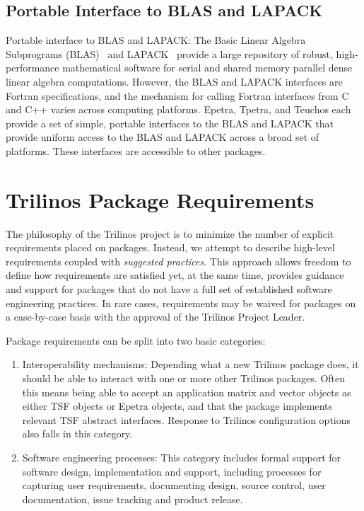 \documentclass[12pt,relax]{TrilinosDevGuide}
\begin{document}
\subsection{Portable Interface to BLAS and LAPACK}

Portable interface to BLAS and LAPACK: The Basic Linear Algebra
Subprograms (BLAS)~\cite{BLAS1,BLAS2,BLAS3} and LAPACK~\cite{lapack}
provide a large repository of robust, high-performance mathematical
software for serial and shared memory parallel dense linear algebra
computations.  However, the BLAS and LAPACK interfaces are Fortran
specifications, and the mechanism for calling Fortran interfaces from
C and C++ varies across computing platforms.  Epetra, Tpetra, and 
Teuchos each provide a set of simple, portable interfaces to the BLAS 
and LAPACK that provide uniform access to the BLAS and LAPACK across 
a broad set of platforms.  These interfaces are accessible to
other packages.

\section{Trilinos Package Requirements}
\label{Section:PackageRequirements}
The philosophy of the Trilinos project is to minimize the number of
explicit requirements placed on packages.  Instead, we attempt to
describe high-level requirements coupled with {\it suggested
practices}.  This approach allows freedom to define how
requirements are satisfied yet, at the same time, provides guidance
and support for packages that do not have a full set of established
software engineering practices.  In rare cases, requirements may be waived for 
packages on a case-by-case basis with the approval of the Trilinos Project 
Leader.

Package requirements can be split into two basic categories:
\begin{enumerate}
\item Interoperability mechanisms: Depending what a new Trilinos
package does, it should be able to interact with one or more other
Trilinos packages.  Often this means being able to accept an application
matrix and vector objects as either TSF objects or Epetra objects, and
that the package implements relevant TSF abstract interfaces.
Response to Trilinos configuration options also falls in this category.
\item Software engineering processes: This category includes formal
support for software design, implementation and support, including
processes for capturing user requirements, documenting
design, source control, user documentation, issue tracking and product
release.
\end{enumerate}
\end{document}
